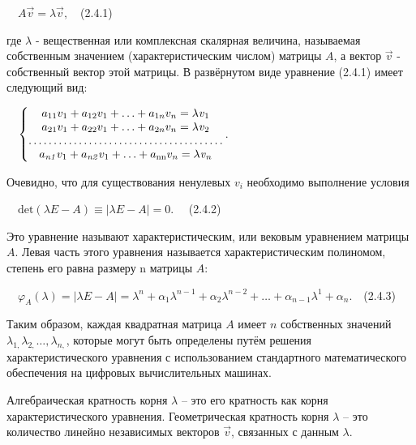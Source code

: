 		\ \  $A\vec v=\lambda \vec v,$\ \ (2.4.1)



		где  $\lambda $ - вещественная или комплексная скалярная величина, назы­ваемая собственным значением (характеристическим
		числом) матрицы  $A$, а вектор  $\vec v$ - собственный вектор этой матрицы. В развёрну­том виде уравнение (2.4.1) имеет
		следующий вид:



		\ \  $\left\{\begin{matrix}a_{11}v_1+a_{12}v_1+\ldots +a_{1n}v_n=\mathit{\lambda v}_1\\a_{21}v_1+a_{22}v_1+\ldots
		+a_{2n}v_n=\mathit{\lambda v}_2\\\ldots \ldots \ldots \ldots \ldots \ldots \ldots \ldots \ldots \ldots \ldots \ldots \ldots
		\\a_{\mathit{n1}}v_1+a_{\mathit{n2}}v_1+\ldots
		+a_{\normalsubformula{\text{nn}}}v_n=\mathit{\lambda v}_n\end{matrix}\right.$.\ \ 



		Очевидно, что для существования ненулевых  $v_i$ необходимо вы­пол­не­ние условия



		\ \  $\text{det}(\mathit{\lambda E}-A)\equiv |\mathit{\lambda E}-A|=0$. \ \ (2.4.2)



		Это уравнение называют характеристическим, или вековым уравнением матрицы  $A$. Левая часть этого уравнения называется
		характеристичес­ким полиномом, степень его равна размеру {n} матрицы  $A$:



		\ \  $\varphi _A(\lambda )=|\mathit{\lambda E}-A|=\lambda ^n+\alpha _1\lambda ^{n-1}+\alpha _2\lambda ^{n-2}+\ldots +\alpha _{n-1}\lambda ^1+\alpha _n$.\ \ (2.4.3)



		Таким образом, каждая квадратная матрица  $A$ имеет  $n$ собственных зна­чений  $\lambda _{1,}\lambda _{2,}\ldots ,\lambda _{n,}$, которые
		могут быть определены путём решения характеристического уравнения с использованием стандартного матема­тического
		обеспечения на цифровых вычислительных машинах.



\bigskip


		Алгебраическая кратность корня  $\lambda $ – это его кратность как корня характеристического уравнения. Геометрическая
		кратность корня  $\lambda $ – это количество линейно независимых векторов  $\vec v$, связанных с   данным  $\lambda $.


